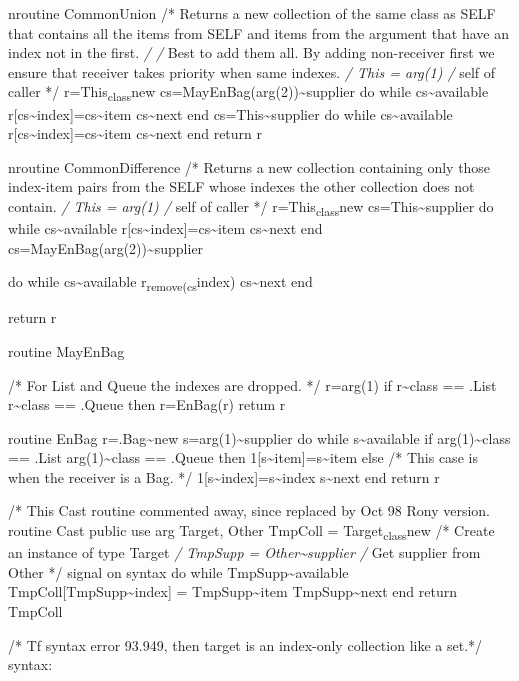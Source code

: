 nroutine CommonUnion /* Returns a new collection of the same class as
SELF that contains all the items from SELF and items from the argument
that have an index not in the first. \emph{/ /} Best to add them all. By
adding non-receiver first we ensure that receiver takes priority when
same indexes. \emph{/ This = arg(1) /} self of caller */
r=This\textsubscript{class}new
cs=MayEnBag(arg(2))\textasciitilde supplier do while
cs\textasciitilde available
r{[}cs\textasciitilde index{]}=cs\textasciitilde item
cs\textasciitilde next end cs=This\textasciitilde supplier do while
cs\textasciitilde available
r{[}cs\textasciitilde index{]}=cs\textasciitilde item
cs\textasciitilde next end return r

nroutine CommonDifference /* Returns a new collection containing only
those index-item pairs from the SELF whose indexes the other collection
does not contain. \emph{/ This = arg(1) /} self of caller */
r=This\textsubscript{class}new cs=This\textasciitilde supplier do while
cs\textasciitilde available
r{[}cs\textasciitilde index{]}=cs\textasciitilde item
cs\textasciitilde next end cs=MayEnBag(arg(2))\textasciitilde supplier

do while cs\textasciitilde available r\textsubscript{remove(cs}index)
cs\textasciitilde next end

return r

routine MayEnBag

/* For List and Queue the indexes are dropped. */ r=arg(1) if
r\textasciitilde class == .List \textbar{} r\textasciitilde class ==
.Queue then r=EnBag(r) retum r

routine EnBag r=.Bag\textasciitilde new s=arg(1)\textasciitilde supplier
do while s\textasciitilde available if arg(1)\textasciitilde class ==
.List \textbar{} arg(1)\textasciitilde class == .Queue then
1{[}s\textasciitilde item{]}=s\textasciitilde item else /* This case is
when the receiver is a Bag. */
1{[}s\textasciitilde index{]}=s\textasciitilde index
s\textasciitilde next end return r

/* This Cast routine commented away, since replaced by Oct 98 Rony
version. routine Cast public use arg Target, Other TmpColl =
Target\textsubscript{class}new /* Create an instance of type Target
\emph{/ TmpSupp = Other\textasciitilde supplier /} Get supplier from
Other */ signal on syntax do while TmpSupp\textasciitilde available
TmpColl{[}TmpSupp\textasciitilde index{]} = TmpSupp\textasciitilde item
TmpSupp\textasciitilde next end return TmpColl

/* Tf syntax error 93.949, then target is an index-only collection like
a set.*/ syntax:

